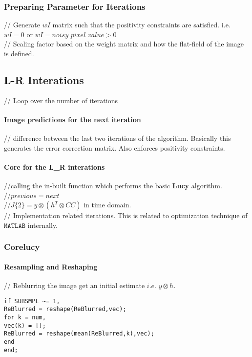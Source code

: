 \documentclass[a4paper]{book}
\begin{document}
\subsubsection{Preparing Parameter for Iterations}
// Generate $ wI $ matrix such that the positivity constraints are satisfied. i.e. $ wI = 0$ or $ wI = noisy$ $pixel$ $ value > 0 $\\
// Scaling factor based on the weight matrix and how the flat-field of the image is defined.
\subsection{L-R Interations}
// Loop over the number of iterations
\paragraph{Image predictions for the next iteration}
// difference between the last two iterations of the algorithm. Basically this generates the error correction matrix. Also enforces positivity constraints.\cite{matlabpaper2}
\paragraph{Core for the L\_R interations}
//calling the in-built function which performs the basic \textbf{Lucy} algorithm.\\
 //$ previous = next $\\
 //$ J\{2\} = y \otimes \left(h^T \otimes CC\right)$ in time domain.\\
 // Implementation related iterations. This is related to optimization technique of $ \mathtt{MATLAB} $ internally.
\subsubsection{Corelucy}
\paragraph{Resampling and Reshaping}
 // Reblurring the image get an initial estimate $i.e.$ $ y\otimes h $.
\begin{lstlisting}
if SUBSMPL ~= 1,
ReBlurred = reshape(ReBlurred,vec);
for k = num,
vec(k) = [];
ReBlurred = reshape(mean(ReBlurred,k),vec);
end
end;
\end{lstlisting}
\end{document}

